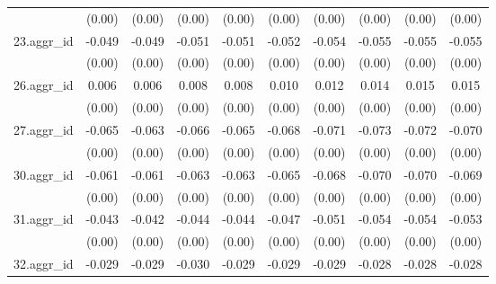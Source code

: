 {\begin{tabular}{l*{9}{c}}
          &   (0.00)         &   (0.00)         &   (0.00)         &   (0.00)         &   (0.00)         &   (0.00)         &   (0.00)         &   (0.00)         &   (0.00)         \\
[1em]
23.aggr\_id&   -0.049\sym{***}&   -0.049\sym{***}&   -0.051\sym{***}&   -0.051\sym{***}&   -0.052\sym{***}&   -0.054\sym{***}&   -0.055\sym{***}&   -0.055\sym{***}&   -0.055\sym{***}\\
          &   (0.00)         &   (0.00)         &   (0.00)         &   (0.00)         &   (0.00)         &   (0.00)         &   (0.00)         &   (0.00)         &   (0.00)         \\
[1em]
26.aggr\_id&    0.006\sym{**} &    0.006\sym{***}&    0.008\sym{***}&    0.008\sym{***}&    0.010\sym{***}&    0.012\sym{***}&    0.014\sym{***}&    0.015\sym{***}&    0.015\sym{***}\\
          &   (0.00)         &   (0.00)         &   (0.00)         &   (0.00)         &   (0.00)         &   (0.00)         &   (0.00)         &   (0.00)         &   (0.00)         \\
[1em]
27.aggr\_id&   -0.065\sym{***}&   -0.063\sym{***}&   -0.066\sym{***}&   -0.065\sym{***}&   -0.068\sym{***}&   -0.071\sym{***}&   -0.073\sym{***}&   -0.072\sym{***}&   -0.070\sym{***}\\
          &   (0.00)         &   (0.00)         &   (0.00)         &   (0.00)         &   (0.00)         &   (0.00)         &   (0.00)         &   (0.00)         &   (0.00)         \\
[1em]
30.aggr\_id&   -0.061\sym{***}&   -0.061\sym{***}&   -0.063\sym{***}&   -0.063\sym{***}&   -0.065\sym{***}&   -0.068\sym{***}&   -0.070\sym{***}&   -0.070\sym{***}&   -0.069\sym{***}\\
          &   (0.00)         &   (0.00)         &   (0.00)         &   (0.00)         &   (0.00)         &   (0.00)         &   (0.00)         &   (0.00)         &   (0.00)         \\
[1em]
31.aggr\_id&   -0.043\sym{***}&   -0.042\sym{***}&   -0.044\sym{***}&   -0.044\sym{***}&   -0.047\sym{***}&   -0.051\sym{***}&   -0.054\sym{***}&   -0.054\sym{***}&   -0.053\sym{***}\\
          &   (0.00)         &   (0.00)         &   (0.00)         &   (0.00)         &   (0.00)         &   (0.00)         &   (0.00)         &   (0.00)         &   (0.00)         \\
[1em]
32.aggr\_id&   -0.029\sym{***}&   -0.029\sym{***}&   -0.030\sym{***}&   -0.029\sym{***}&   -0.029\sym{***}&   -0.029\sym{***}&   -0.028\sym{***}&   -0.028\sym{***}&   -0.028\sym{***}\\

\end{tabular}}
